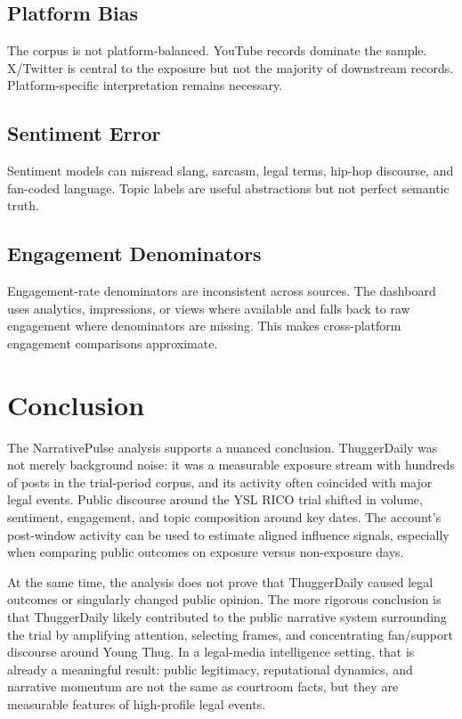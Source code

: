 \documentclass[12pt]{article}
\begin{document}
\subsection{Platform Bias}
The corpus is not platform-balanced. YouTube records dominate the sample. X/Twitter is central to the exposure but not the majority of downstream records. Platform-specific interpretation remains necessary.

\subsection{Sentiment Error}
Sentiment models can misread slang, sarcasm, legal terms, hip-hop discourse, and fan-coded language. Topic labels are useful abstractions but not perfect semantic truth.

\subsection{Engagement Denominators}
Engagement-rate denominators are inconsistent across sources. The dashboard uses analytics, impressions, or views where available and falls back to raw engagement where denominators are missing. This makes cross-platform engagement comparisons approximate.

\section{Conclusion}
The NarrativePulse analysis supports a nuanced conclusion. ThuggerDaily was not merely background noise: it was a measurable exposure stream with hundreds of posts in the trial-period corpus, and its activity often coincided with major legal events. Public discourse around the YSL RICO trial shifted in volume, sentiment, engagement, and topic composition around key dates. The account's post-window activity can be used to estimate aligned influence signals, especially when comparing public outcomes on exposure versus non-exposure days.

At the same time, the analysis does not prove that ThuggerDaily caused legal outcomes or singularly changed public opinion. The more rigorous conclusion is that ThuggerDaily likely contributed to the public narrative system surrounding the trial by amplifying attention, selecting frames, and concentrating fan/support discourse around Young Thug. In a legal-media intelligence setting, that is already a meaningful result: public legitimacy, reputational dynamics, and narrative momentum are not the same as courtroom facts, but they are measurable features of high-profile legal events.
\end{document}
